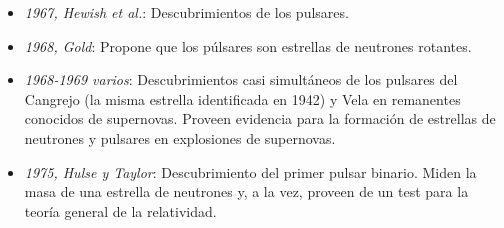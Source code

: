 \begin{itemize}
\item \emph{1967, Hewish et al.}: Descubrimientos de los pulsares.
\item \emph{1968, Gold}: Propone que los púlsares son estrellas de neutrones rotantes.
\item \emph{1968-1969 varios}: Descubrimientos casi simultáneos de los pulsares del Cangrejo (la misma estrella identificada en 1942) y Vela en remanentes conocidos de supernovas. Proveen evidencia para la formación de estrellas de neutrones y pulsares en explosiones de supernovas.
\item \emph{1975, Hulse y Taylor}: Descubrimiento del primer pulsar binario. Miden la masa de una estrella de neutrones y, a la vez, proveen de un test para la teoría general de la relatividad.
\end{itemize}